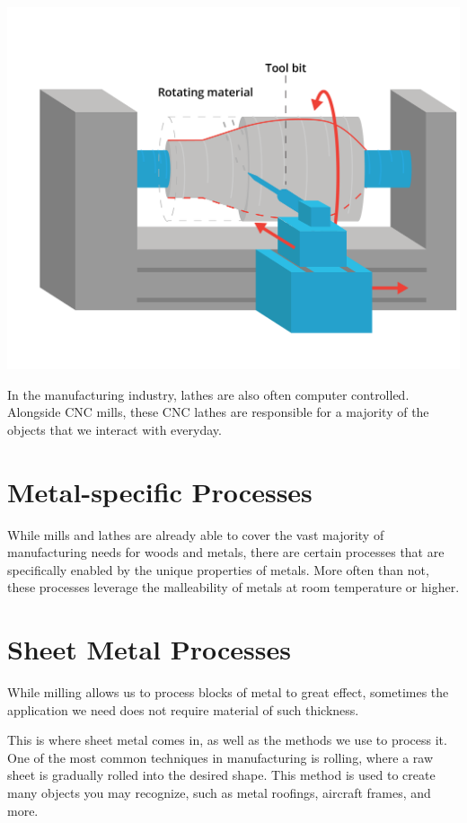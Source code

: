 \includegraphics[width=.75\textwidth]{lathe.png}


In the manufacturing industry, lathes are also often computer controlled. Alongside CNC mills, these CNC lathes are responsible for a majority of the objects that we interact with everyday.

\section{Metal-specific Processes}

While mills and lathes are already able to cover the vast majority of manufacturing needs for woods and metals, there are certain processes that are specifically enabled by the unique properties of metals. More often than not, these processes leverage the malleability of metals at room temperature or higher.

\section{Sheet Metal Processes}

While milling allows us to process blocks of metal to great effect, sometimes the application we need does not require material of such thickness.

This is where sheet metal comes in, as well as the methods we use to process it. One of the most common techniques in manufacturing is rolling, where a raw sheet is gradually rolled into the desired shape. This method is used to create many objects you may recognize, such as metal roofings, aircraft frames, and more.

